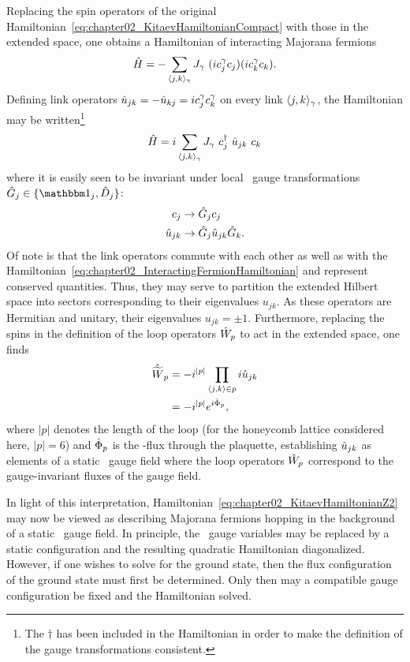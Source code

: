 Replacing the spin operators of the original Hamiltonian~\eqref{eq:chapter02_KitaevHamiltonianCompact} with those in the extended space, one obtains a Hamiltonian of interacting Majorana fermions
%
\begin{equation}
	\hat{H} = -\sum_{\langle j,k \rangle_{\gamma}} J_{\gamma}~(i c_j^{\gamma} c_j) (i c_k^{\gamma} c_k).
	\label{eq:chapter02_InteractingFermionHamiltonian}
\end{equation}
%
Defining link operators $\hat{u}_{jk} = -\hat{u}_{kj} = i c_j^{\gamma} c_k^{\gamma}$ on every link $\langle j,k \rangle_{\gamma}$, the Hamiltonian may be written\footnote{The $\dag$ has been included in the Hamiltonian in order to make the definition of the gauge transformations consistent.}
%
\begin{equation}
	\hat{H} = i \sum_{\langle j,k \rangle_{\gamma}} J_{\gamma}~c^{\dagger}_j~\hat{u}_{jk}~c_k
	\label{eq:chapter02_KitaevHamiltonianZ2}
\end{equation}
%
where it is easily seen to be invariant under local \ZZ~gauge transformations\linebreak $\op{G}_j \in \{\id_j,\op{D}_j\}$:
%
\begin{align}
	c_j &\rightarrow \hat{G}_j c_j \nonumber\\
	\hat{u}_{jk} &\rightarrow \hat{G}_j \hat{u}_{jk} \hat{G}_k.
\end{align}
%
Of note is that the link operators commute with each other as well as with the Hamiltonian~\eqref{eq:chapter02_InteractingFermionHamiltonian} and represent conserved quantities.
Thus, they may serve to partition the extended Hilbert space into sectors corresponding to their eigenvalues $u_{jk}$.
As these operators are Hermitian and unitary, their eigenvalues $u_{jk} = \pm 1$.
Furthermore, replacing the spins in the definition of the loop operators $\hat{W}_p$ to act in the extended space, one finds
%
\begin{align}
	\hat{\widetilde{W}}_p	&= -i^{|p|}\prod_{\langle j,k \rangle\in p} i \hat{u}_{jk} \nonumber\\
				&= -i^{|p|} e^{i \hat{\Phi}_p},
\end{align}
%
where $|p|$ denotes the length of the loop (for the honeycomb lattice considered here, $|p| = 6$) and $\hat{\Phi}_p$ is the \ZZ-flux through the plaquette, establishing $\hat{u}_{jk}$ as elements of a static \ZZ~gauge field where the loop operators $\hat{W}_p$ correspond to the gauge-invariant fluxes of the gauge field.

In light of this interpretation, Hamiltonian~\eqref{eq:chapter02_KitaevHamiltonianZ2} may now be viewed as describing Majorana fermions hopping in the background of a static \ZZ~gauge field.
In principle, the \ZZ~gauge variables may be replaced by a static configuration and the resulting quadratic Hamiltonian diagonalized.
However, if one wishes to solve for the ground state, then the flux configuration of the ground state must first be determined.
Only then may a compatible gauge configuration be fixed and the Hamiltonian solved.


